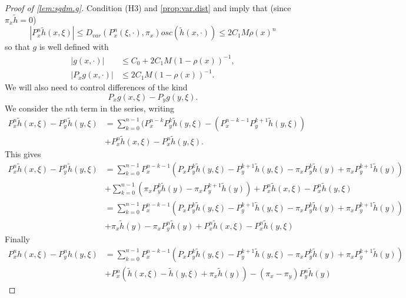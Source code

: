 \begin{proof}[Proof of \cref{lem:sgdm.g}]

Condition (H3) and  \cref{prop:var.dist} and imply that (since $\pi_x \tilde h  = 0$)
\[
|P_x^n \tilde h(x, \xi)| \leq D_{\mathit{var}}(P_x^n(\xi, \cdot), \pi_x) \mathit{osc}(\tilde h(x, \cdot))\leq 2 C_1 M \rho(x)^n
\]
so that $g$ is well defined with 
\begin{align*}
|g(x, \cdot)| &\leq C_0 + 2C_1M (1- \rho(x))^{-1},\\
|P_xg(x, \cdot)| &\leq 2C_1M (1- \rho(x))^{-1}.
\end{align*}
We will also need to control differences of the kind
\[
P_x g(x, \xi) - P_yg(y, \xi).
\]
We consider the $n$th term in the series, writing 
\begin{align*}
P_x^n \tilde h(x, \xi) - P_y^n \tilde h(y, \xi) & = \sum_{k=0}^{n-1} (P_x^{n-k}P_y^k \tilde h(y, \xi)  - (P_x^{n-k-1}P_y^{k+1} \tilde h(y, \xi))\\
&+ P_x^n \tilde h(x, \xi) - P_x^{n}\tilde  h(y, \xi).
\end{align*}
This gives
\begin{align*}
P_x^n \tilde h(x, \xi) - P_y^n \tilde h(y, \xi) & = \sum_{k=0}^{n-1} P_x^{n-k-1}(P_xP_y^k \tilde h(y, \xi) - P_y^{k+1} \tilde h(y, \xi) - \pi_xP_y^k \tilde h(y) + \pi_xP_y^{k+1} \tilde h(y) )\\
&+ \sum_{k=0}^{n-1} (\pi_xP_y^k \tilde h(y) - \pi_xP_y^{k+1} \tilde h(y))+ P_x^n \tilde h(x, \xi) - P_x^{n} \tilde  h(y, \xi)\\
& = \sum_{k=0}^{n-1} P_x^{n-k-1}(P_xP_y^k \tilde h(y, \xi) - P_y^{k+1} \tilde h(y, \xi) - \pi_xP_y^k \tilde h(y) + \pi_xP_y^{k+1} \tilde h(y) )\\
&+ \pi_x \tilde h(y) - \pi_xP_y^{n} \tilde h(y) + P_x^n \tilde h(x, \xi) - P_x^{n} \tilde  h(y, \xi)
\end{align*}
Finally
\begin{align*}
P_x^n h(x, \xi) - P_y^n h(y, \xi) & =
 \sum_{k=0}^{n-1} P_x^{n-k-1}(P_xP_y^k \tilde h(y, \xi) - P_y^{k+1} \tilde h(y, \xi) - \pi_xP_y^k \tilde h(y) + \pi_xP_y^{k+1} \tilde h(y) )\\
&+ P_x^{n} (\tilde h(x, \xi) - \tilde h(y, \xi) + \pi_x \tilde h(y)) - (\pi_x - \pi_y) P_y^{n} \tilde h(y)  
\end{align*}


\end{proof}
